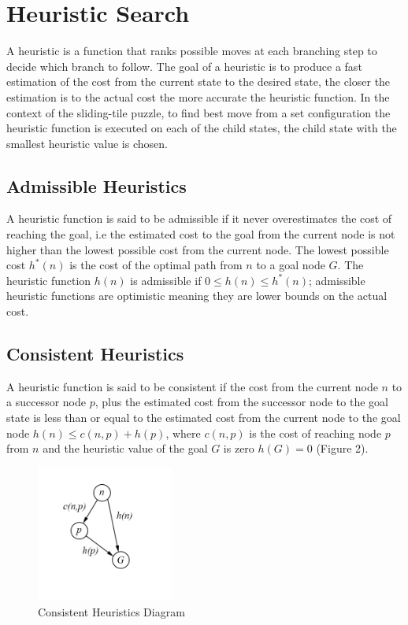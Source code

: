 \documentclass[final]{cmpreport}
\begin{document}
\section{Heuristic Search} \label{sec1}
 A heuristic is a function that ranks possible moves at each branching step to decide which branch to follow. The goal of a heuristic is to produce a fast estimation of the cost from the current state to the desired state, the closer the estimation is to the actual cost the more accurate the heuristic function. In the context of the sliding-tile puzzle, to find best move from a set configuration the heuristic function is executed on each of the child states, the child state with the smallest heuristic value is chosen.
 


\subsection{Admissible Heuristics}
A heuristic function is said to be admissible if it never overestimates the cost of reaching the goal, i.e the estimated cost to the goal from the current node is not higher than the lowest possible cost from the current node. The lowest possible cost $h^*(n)$ is the cost of the optimal path from $n$ to a goal node $G$. The heuristic function $h(n)$ is admissible if $0 \leq h(n) \leq h^*(n)$; admissible heuristic functions are optimistic meaning they are lower bounds on the actual cost.

\subsection{Consistent Heuristics}
 A heuristic function is said to be consistent if the cost from the current node $n$ to a successor node $p$, plus the estimated cost from the successor node to the goal state is less than or equal to the estimated cost from the current node to the goal node $h(n)\leq c(n,p) + h(p)$, where $c(n,p)$ is the cost of reaching node $p$ from $n$ and the heuristic value of the goal $G$ is zero $h(G)=0$ (Figure 2). 


\begin{figure}[ht]
	\centering
	\includegraphics[width=0.4\textwidth]{consistent}
	\captionsetup{justification=centering}
	\caption{Consistent Heuristics Diagram}
\end{figure}
\end{document}
